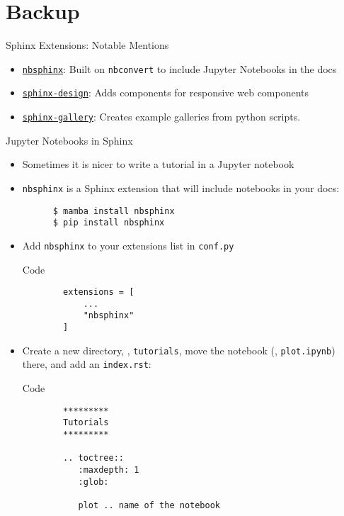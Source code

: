 \appendix
\section{Backup}

\begin{frame}{Sphinx Extensions: Notable Mentions}
  \begin{itemize}
    \setlength{\itemsep}{1em}
    \item \href{https://nbsphinx.readthedocs.io}{\texttt{nbsphinx}}: Built on \texttt{nbconvert} to include Jupyter Notebooks in the docs
    \item \href{https://sphinx-design.readthedocs.io/en/latest/}{\texttt{sphinx-design}}: Adds components for responsive web components
    \item \href{https://sphinx-gallery.github.io/stable/index.html}{\texttt{sphinx-gallery}}: Creates example galleries from python scripts.
  \end{itemize}
\end{frame}

\begin{frame}[fragile]{
    Jupyter Notebooks in Sphinx
    \hfill
  }
  \begin{itemize}
    \setlength{\itemsep}{0.75em}
    \item Sometimes it is nicer to write a tutorial in a Jupyter notebook
    \item \texttt{nbsphinx} is a Sphinx extension that will include notebooks in your docs:
    \begin{verbatim}
      $ mamba install nbsphinx
      $ pip install nbsphinx
    \end{verbatim}
    \item Add \texttt{nbsphinx} to your extensions list in \texttt{conf.py}
    \begin{block}{Code}
      \scriptsize
      \begin{verbatim}
        extensions = [
            ...
            "nbsphinx"
        ]
      \end{verbatim}
    \end{block}
    \item Create a new directory, \eg, \texttt{tutorials}, move the notebook (\eg, \texttt{plot.ipynb}) there,
    and add an \texttt{index.rst}:
    \begin{block}{Code}
      \scriptsize
      \begin{verbatim}
        *********
        Tutorials
        *********

        .. toctree::
           :maxdepth: 1
           :glob:

           plot .. name of the notebook
      \end{verbatim}
    \end{block}
  \end{itemize}
\end{frame}


